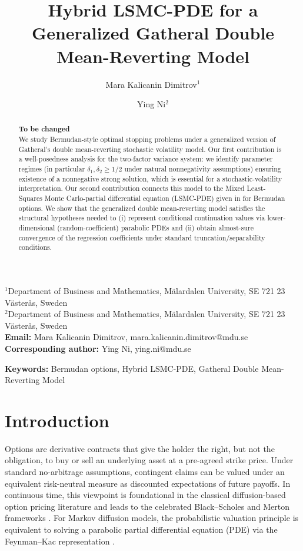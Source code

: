 \documentclass[10pt]{article}
\title{Hybrid LSMC-PDE for a Generalized Gatheral Double Mean-Reverting Model}
\author{%
Mara Kalicanin Dimitrov$^{1}$ \and
Ying Ni$^{2}$%
}
\date{}
\theoremstyle{plain}
\theoremstyle{definition}
\theoremstyle{remark}
\newcommand{\keywords}[1]{\par\noindent\textbf{Keywords:} #1\par}
\begin{document}
\maketitle

\begin{center}
\small
$^{1}$Department of Business and Mathematics, M\"{a}lardalen University, SE 721 23 V\"{a}ster{\aa}s, Sweden\\
$^{2}$Department of Business and Mathematics, M\"{a}lardalen University, SE 721 23 V\"{a}ster{\aa}s, Sweden\\[4pt]
\textbf{Email:} Mara Kalicanin Dimitrov, mara.kalicanin.dimitrov@mdu.se\\
\textbf{Corresponding author:} Ying Ni, ying.ni@mdu.se\\
\end{center}

\begin{abstract}
\textbf{To be changed}\\
We study Bermudan-style optimal stopping problems under a generalized version of Gatheral's
double mean-reverting stochastic volatility model. Our first contribution is a well-posedness analysis for the
two-factor variance system: we identify parameter regimes (in particular $\delta_1,\delta_2\ge 1/2$
under natural nonnegativity assumptions) ensuring existence of a nonnegative strong solution,
which is essential for a stochastic-volatility interpretation.
Our second contribution connects this model to the Mixed Least-Squares Monte Carlo-partial
differential equation (LSMC-PDE) given in \citet{farahany2020mixing} for Bermudan
options. We show that the generalized double
mean-reverting model satisfies the structural hypotheses needed to (i) represent conditional
continuation values via lower-dimensional (random-coefficient) parabolic PDEs and (ii) obtain
almost-sure convergence of the regression coefficients under standard truncation/separability
conditions.
\end{abstract}

\keywords{Bermudan options, Hybrid LSMC-PDE, Gatheral Double Mean-Reverting Model}


\section{Introduction}

Options are derivative contracts that give the holder the right, but not the obligation, to buy or sell an underlying asset at a pre-agreed strike price.
Under standard no-arbitrage assumptions, contingent claims can be valued under an equivalent risk-neutral measure as discounted expectations of future payoffs.
In continuous time, this viewpoint is foundational in the classical diffusion-based option pricing literature and leads to the celebrated Black--Scholes and Merton frameworks \citep{black1973pricing,merton1973theory}.
For Markov diffusion models, the probabilistic valuation principle is equivalent to solving a parabolic partial differential equation (PDE) via the Feynman--Kac representation \citep{karatzas1991brownian}.
\end{document}
